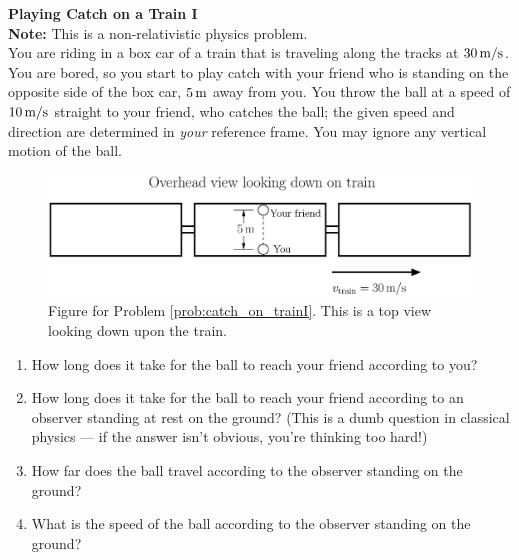 \begin{problem}{\bf Playing Catch on a Train I}\\
{\bf Note:} This is a non-relativistic physics problem.\\
You are riding in a box car of a train that is traveling along the tracks
at $30\,\mbox{m/s}$.  You are bored, so you start to play catch with
your friend who is standing on the opposite side of the box car, $5\,\mbox{m}$
away from you.  You throw the ball at a speed of $10\,\mbox{m/s}$
straight to your friend, who catches the ball; the given speed and direction
are determined in {\em your\/} reference frame.  You may ignore any vertical
motion of the ball.
 \begin{figure}[h]
    \begin{center}
    \includegraphics[width=5.5in]{basic_postulates_of_relativity/catch_on_trainI.eps}
    \end{center}
    \caption{Figure for Problem \ref{prob:catch_on_trainI}.  This is
    a top view looking down upon the train.}
    \label{fig:catch_on_trainI}
  \end{figure}
\begin{enumerate}
\item How long does it take for the ball to reach your friend according
to you?
\item How long does it take for the ball to reach your friend according
to an observer standing at rest on the ground?  (This is a dumb question in
classical physics --- if the answer isn't obvious, you're thinking too
hard!)
\item How far does the ball travel according to the observer
standing on the ground?
\item What is the speed of the ball according to the observer
standing on the ground?
\end{enumerate}

\label{prob:catch_on_trainI}
\end{problem}

